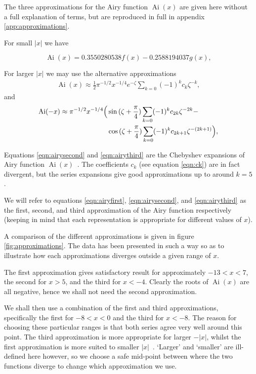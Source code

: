 \documentclass[]{article}
\renewcommand{\mod}[1]{\ensuremath{\lvert {#1} \rvert}}
\newcommand{\Ai}[1]{\ensuremath{\operatorname{Ai}({#1})}}
\begin{document}
The three approximations for the Airy function $\Ai{x}$ are given here without a full explanation of terms, but are reproduced in full in appendix \ref{app:approximations}.

For small $\mod{x}$ we have~\cite{ref:abramowitz}

\begin{equation}\label{eqn:airyfirst}
\Ai{x} = 0.3550280538f(x) - 0.2588194037g(x),
\end{equation}

For larger $\mod{x}$ we may use the alternative approximations
\begin{align}\label{eqn:airysecond}
\Ai{x} \approx \frac{1}{2}\pi^{-1/2}x^{-1/4}e^{-\zeta} \sum\limits_{k=0} (-1)^{k}c_{k}\zeta^{-k},
\end{align}
and
\begin{equation}\label{eqn:airythird}
	\begin{split}
		\Ai{-x} \approx \pi^{-1/2}x^{-1/4}
		\Bigl(
			&\sin{(\zeta + \frac{\pi}{4})}\sum\limits_{k=0}(-1)^{k}c_{2k}\zeta^{-2k} -\\
			&\cos{(\zeta + \frac{\pi}{4})}\sum\limits_{k=0}(-1)^{k}c_{2k+1}\zeta^{-(2k+1)}
		\Bigr),
	\end{split}
\end{equation}

Equations \ref{eqn:airysecond} and \ref{eqn:airythird} are the Chebyshev expansions of Airy function $\Ai{x}$~\cite{ref:agil}. The coefficients $c_{k}$ (see equation \ref{eqn:ck}) are in fact divergent, but the series expansions give good approximations up to around $k = 5$.

We will refer to equations \ref{eqn:airyfirst}, \ref{eqn:airysecond}, and \ref{eqn:airythird} as the first, second, and third approximation of the Airy function respectively (keeping in mind that each representation is appropriate for different values of $x$).

A comparison of the different approximations is given in figure \ref{fig:approximations}. The data has been presented in such a way so as to illustrate how each approximations diverges outside a given range of $x$.

The first approximation gives satisfactory result for approximately $-13 < x < 7$, the second for $x > 5$, and the third for $x < -4$. Clearly the roots of \Ai{x} are all negative, hence we shall not need the second approximation.

We shall then use a combination of the first and third approximations, specifically the first for $-8 < x < 0$ and the third for $x < -8$. The reason for choosing these particular ranges is that both series agree very well around this point. The third approximation is more appropriate for larger $-\mod{x}$, whilst the first approximation is more suited to smaller $\mod{x}$~\cite{ref:gdaniell}. `Larger' and `smaller' are ill-defined here however, so we choose a safe mid-point between where the two functions diverge to change which approximation we use.
\end{document}
